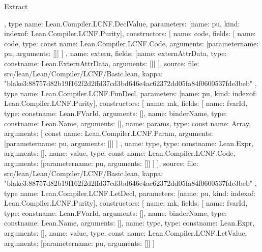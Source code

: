 \begin{lexlean}{Extract}
\begin{toolingmodule}
{{{      }
    },
    type{
      name: Lean.Compiler.LCNF.DeclValue,
      parameters: [{name: pu, kind: index{of: Lean.Compiler.LCNF.Purity}}],
      constructors: [
        {
          name: code,
          fields: [
            {
              name: code,
              type: const{
                name: Lean.Compiler.LCNF.Code,
                arguments: [parameter{name: pu, arguments: []}]
              }
            }
          ]
        },
        {
          name: extern,
          fields: [{name: externAttrData, type: const{name: Lean.ExternAttrData, arguments: []}}]
        }
      ],
      source: {
        file: src/lean/Lean/Compiler/LCNF/Basic.lean,
        kappa: "blake3:88757d82b19f162f2d2ffd37cd3bd646e4ac62372dd05fa84f0600537fde3beb"
      }
    },
    type{
      name: Lean.Compiler.LCNF.FunDecl,
      parameters: [{name: pu, kind: index{of: Lean.Compiler.LCNF.Purity}}],
      constructors: [
        {
          name: mk,
          fields: [
            {name: fvarId, type: const{name: Lean.FVarId, arguments: []}},
            {name: binderName, type: const{name: Lean.Name, arguments: []}},
            {
              name: params,
              type: const{
                name: Array,
                arguments: [
                  const{
                    name: Lean.Compiler.LCNF.Param,
                    arguments: [parameter{name: pu, arguments: []}]
                  }
                ]
              }
            },
            {name: type, type: const{name: Lean.Expr, arguments: []}},
            {
              name: value,
              type: const{
                name: Lean.Compiler.LCNF.Code,
                arguments: [parameter{name: pu, arguments: []}]
              }
            }
          ]
        }
      ],
      source: {
        file: src/lean/Lean/Compiler/LCNF/Basic.lean,
        kappa: "blake3:88757d82b19f162f2d2ffd37cd3bd646e4ac62372dd05fa84f0600537fde3beb"
      }
    },
    type{
      name: Lean.Compiler.LCNF.LetDecl,
      parameters: [{name: pu, kind: index{of: Lean.Compiler.LCNF.Purity}}],
      constructors: [
        {
          name: mk,
          fields: [
            {name: fvarId, type: const{name: Lean.FVarId, arguments: []}},
            {name: binderName, type: const{name: Lean.Name, arguments: []}},
            {name: type, type: const{name: Lean.Expr, arguments: []}},
            {
              name: value,
              type: const{
                name: Lean.Compiler.LCNF.LetValue,
                arguments: [parameter{name: pu, arguments: []}]
              }
            }
          ]
        }
}}
\end{toolingmodule}
\end{lexlean}
